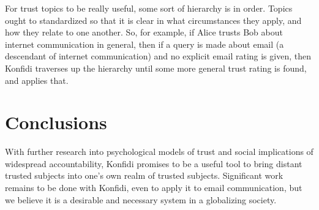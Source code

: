 \documentclass{acm_proc_article-sp}
\begin{document}
For trust topics to be really useful, some sort of hierarchy is in order.  Topics ought to standardized so that it is clear in what circumstances they apply, and how they relate to one another.  So, for example, if Alice trusts Bob about internet communication in general, then if a query is made about email (a descendant of internet communication) and no explicit email rating is given, then Konfidi traverses up the hierarchy until some more general trust rating is found, and applies that.




\section{Conclusions}
With further research into psychological models of trust and social implications of widespread accountability, Konfidi promises to be a useful tool to bring distant trusted subjects into one's own realm of trusted subjects.  Significant work remains to be done with Konfidi, even to apply it to email communication, but we believe it is a desirable and necessary system in a globalizing society.
\end{document}

